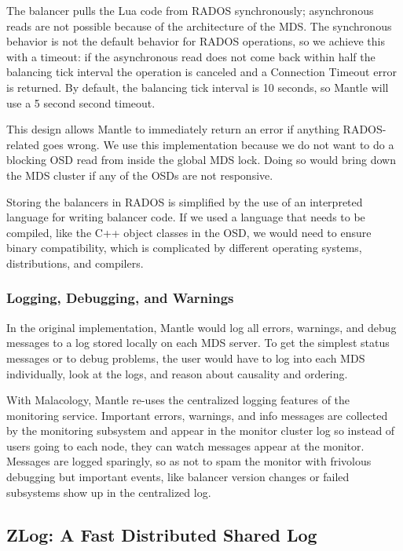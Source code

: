 \documentclass[preprint]{sigplanconf-eurosys}
\begin{document}
The balancer pulls the Lua code from RADOS synchronously; asynchronous reads
are not possible because of the architecture of the MDS. The synchronous
behavior is not the default behavior for RADOS operations, so we achieve this
with a timeout: if the asynchronous read does not come back within half the
balancing tick interval the operation is canceled and a Connection Timeout
error is returned. By default, the balancing tick interval is 10 seconds, so
Mantle will use a 5 second second timeout.

This design allows Mantle to immediately return an error if anything
RADOS-related goes wrong.  We use this implementation because we do not want to
do a blocking OSD read from inside the global MDS lock. Doing so would bring
down the MDS cluster if any of the OSDs are not responsive.

Storing the balancers in RADOS is simplified by the use of an interpreted
language for writing balancer code. If we used a language that needs to be
compiled, like the C++ object classes in the OSD, we would need to ensure
binary compatibility, which is complicated by different operating systems,
distributions, and compilers.

\subsubsection{Logging, Debugging, and Warnings}

In the original implementation, Mantle would log all errors, warnings, and
debug messages to a log stored locally on each MDS server. To get the simplest
status messages or to debug problems, the user would have to log into each MDS
individually, look at the logs, and reason about causality and ordering.

With Malacology, Mantle re-uses the centralized logging features of the
monitoring service. Important errors, warnings, and info messages are collected
by the monitoring subsystem and appear in the monitor cluster log so instead of
users going to each node, they can watch messages appear at the monitor.
Messages are logged sparingly, so as not to spam the monitor with frivolous
debugging but important events, like balancer version changes or failed
subsystems show up in the centralized log.

\subsection{ZLog: A Fast Distributed Shared Log}
\label{sec:zlog}
\end{document}
